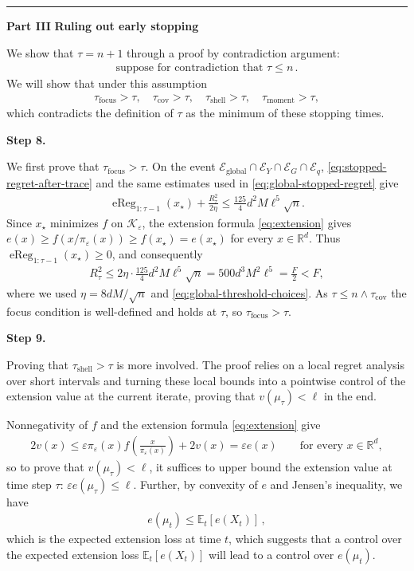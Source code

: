\documentclass[12pt,cleveref]{jmlr}
\newcommand{\proofpart}[2]{%
    \par\addvspace{1.2\baselineskip}
    \noindent
    \textcolor{blue!55!black}{\rule[-0.2ex]{2pt}{1.25em}}%
    \hspace{0.6em}%
    {\sffamily\bfseries\color{blue!55!black}Part #1}%
    \hspace{0.8em}%
    {\sffamily\bfseries #2}%
    \par\nobreak\smallskip
    \noindent\ignorespaces
}
\newcommand{\proofstepinline}[1]{%
    \par\addvspace{0.6\baselineskip}
    \noindent
    {\normalfont\normalsize\bfseries\color{blue!55!black}Step #1.}\enspace\ignorespaces
}
\newcommand{\R}{\mathbb R}
\newcommand{\E}{\mathbb E}
\newcommand{\K}{\mathcal K}
\newcommand{\1}{\mathbf 1}
\newcommand{\eps}{\varepsilon}
\begin{document}
\proofpart{III}{Ruling out early stopping}
We show that $\tau=n+1$ through a proof by contradiction argument:
\begin{align}
    \text{suppose for contradiction that } \tau \leq n\,.
\end{align}
We will show that under this assumption
\begin{align}
    \tau_{\mathrm{focus}} > \tau,\quad
    \tau_{\mathrm{cov}} > \tau,\quad
    \tau_{\mathrm{shell}} > \tau,\quad
    \tau_{\mathrm{moment}} > \tau,
\end{align}
which contradicts the definition of $\tau$ as the minimum of these stopping times.

\proofstepinline{8}
We first prove that $\tau_{\mathrm{focus}} > \tau$.
On the event
$\mathcal E_{\mathrm{global}}\cap\mathcal E_Y\cap\mathcal E_G\cap\mathcal E_q$,
\cref{eq:stopped-regret-after-trace} and the same estimates used in
\cref{eq:global-stopped-regret} give
\begin{align}
    \operatorname{eReg}_{1:\tau-1}(x_\star)
    +\frac{R_\tau^2}{2\eta}
    \leq\frac{125}{4}d^2M\ell^5\sqrt n.
\end{align}
Since $x_\star$ minimizes $f$ on $\K_\eps$, the extension formula
\cref{eq:extension} gives
$e(x)\geq f(x/\pi_\eps(x))\geq f(x_\star)=e(x_\star)$ for every $x\in\R^d$.
Thus $\operatorname{eReg}_{1:\tau-1}(x_\star)\geq0$, and consequently
\begin{align}
    R_\tau^2
    \leq2\eta\cdot\frac{125}{4}d^2M\ell^5\sqrt n
    =500d^3M^2\ell^5
    =\frac F2<F,
\end{align}
where we used $\eta=8dM/\sqrt n$ and \cref{eq:global-threshold-choices}.
As $\tau\leq n\wedge\tau_{\mathrm{cov}}$ the focus condition is well-defined
and holds at $\tau$, so $\tau_{\mathrm{focus}}>\tau$.

\proofstepinline{9}
Proving that $\tau_{\mathrm{shell}}>\tau$ is more involved.
The proof relies on a local regret analysis over short intervals and turning these local bounds into a pointwise control of the extension value at the current iterate, proving that $v(\mu_\tau)<\ell$ in the end.

Nonnegativity of $f$ and the extension formula \cref{eq:extension} give
\begin{align}
    2v(x)
    \leq \eps\pi_\eps(x)f\!\left(\frac{x}{\pi_\eps(x)}\right)+2v(x)
    =\eps e(x)
    \qquad\text{for every }x\in\R^d,
\end{align}
so to prove that $v(\mu_\tau)<\ell$, it suffices to upper bound the extension value at time step $\tau$: $\eps e(\mu_\tau) \leq \ell$.
Further, by convexity of $e$ and Jensen's inequality, we have
\begin{align}
    e(\mu_t) \leq \E_t[e(X_t)]\,,
\end{align}
which is the expected extension loss at time $t$,
which suggests that a control over the expected extension loss $\E_t[e(X_t)]$ will lead to a control over $e(\mu_t)$.
\end{document}
